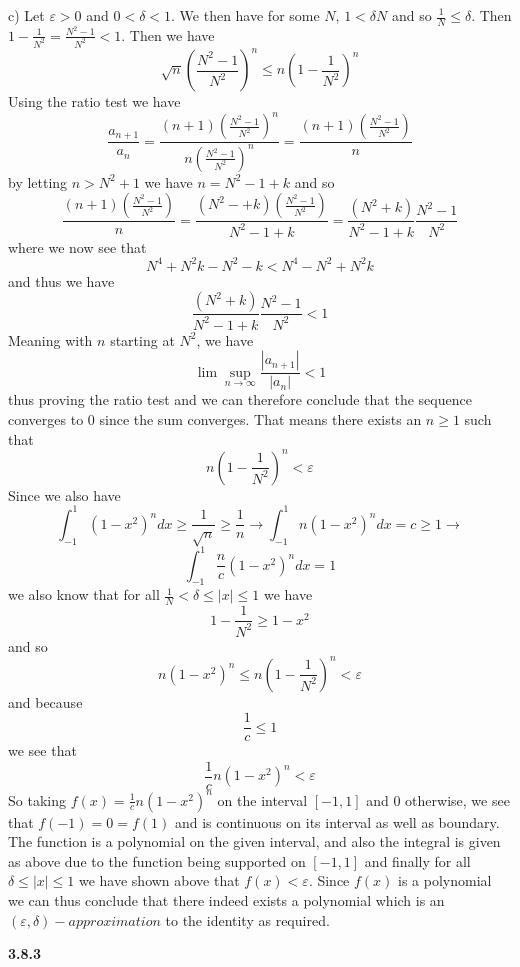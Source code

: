 \documentclass[12pt]{article}
\begin{document}
c) Let $ \varepsilon>0$ and $0<\delta < 1$. We then have for some $N$, $1 <\delta N$ and so $ \frac{1}{N} \leq \delta$. Then  $1-\frac{1}{N^2} = \frac{N^2-1}{N^2}< 1$. Then we have
\[\sqrt{n}\left(\frac{N^2-1}{N^2}\right)^n  \leq n\left(1-\frac{1}{N^2}\right)^n \] Using the ratio test we have
\[\frac{a_{n+1}}{a_n} = \frac{(n+1)\left(\frac{N^2-1}{N^2}\right)^n}{n\left(\frac{N^2-1}{N^2}\right)^n} = \frac{(n+1)\left(\frac{N^2-1}{N^2}\right)}{n}\]
by letting $n > N^2+1$ we have $n = N^2 - 1 + k$ and so
\[\frac{(n+1)\left(\frac{N^2-1}{N^2}\right)}{n} =  \frac{(N^2-+k)\left(\frac{N^2-1}{N^2}\right)}{N^2-1+k} = \frac{(N^2+k)}{N^2-1+k}\frac{N^2-1}{N^2} \] where we now see that
\[N^4 +N^2k -N^2 -k < N^4-N^2+N^2k\] and thus we have
\[\frac{(N^2+k)}{N^2-1+k}\frac{N^2-1}{N^2} < 1\] Meaning with $n$ starting at $N^2$, we have
\[\lim\sup_{n\to \infty}\frac{|a_{n+1}|}{|a_n|}< 1\] thus proving the ratio test and we can therefore conclude that the sequence converges to 0 since the sum converges. That means there exists an $n\geq 1$ such that 
\[n\left(1-\frac{1}{N^2}\right)^n < \varepsilon \] Since we also have
\[\int_{-1}^1(1-x^2)^ndx  \geq \frac{1}{\sqrt{n}} \geq \frac{1}{n} \rightarrow \int_{-1}^1n(1-x^2)^ndx = c\geq1\rightarrow\] \[\int_{-1}^1\frac{n}{c}(1-x^2)^ndx = 1 \]  we also know that for all $\frac{1}{N}<\delta \leq |x|\leq 1$ we have
\[1-\frac{1}{N^2} \geq 1-x^2\] and so 
\[n(1-x^2)^n \leq n\left(1-\frac{1}{N^2}\right)^n< \varepsilon\] and because 
\[\frac{1}{c}\leq 1\] we see that 
\[\frac{1}{c}n(1-x^2)^n< \varepsilon\]
So taking $f(x) = \frac{1}{c}n(1-x^2)^n$ on the interval $[-1,1]$ and $0$ otherwise, we see that $f(-1) = 0 = f(1)$ and is continuous on its interval as well as boundary. The function is a polynomial on the given interval, and also the integral is given as above due to the function being supported on $[-1,1]$ and finally for all $\delta\leq|x|\leq 1$ we have shown above that $f(x) < \varepsilon$. Since $f(x)$ is a polynomial we can thus conclude that there indeed exists a polynomial which is an $(\varepsilon,\delta)-approximation$ to the identity as required.

\textbf{3.8.3}
\end{document}
